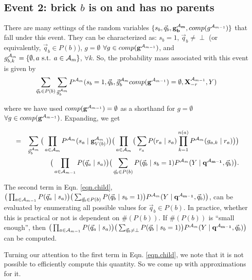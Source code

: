 \documentclass[11pt]{article}
\newcommand{\A}{{\cal A}}
\newcommand{\X}{\mathbf{X}}
\newcommand{\XrmPrev}{\X^{\A_{m-1}}_{-r}}
\newcommand{\Am}{\A_{m}}
\newcommand{\gcompPrev}{comp(\mathbf{g}^{\A_{m-1}})}
\newcommand{\qb}{\vec{q}_b}
\newcommand{\qa}{\vec{q}_a}
\begin{document}
\subsection*{Event 2: brick $b$ is on and has no parents}

There are many settings of the random variables $\{s_b, \qb, \mathbf{g^{\Am}_b}, comp(g^{\A_{m-1}})\}$ that fall under this event. They can be characterized as: $s_b=1$, $\qb \neq \perp$ (or equivalently, $\qb \in P(b)$), $g = \emptyset$ $\forall g \in \gcompPrev$, and $g^{\Am}_{b,k} = \{\emptyset, a \text{ s.t. } a \in {\Am}\}$, $\forall k$. So, the probability mass associated with this event is given by
\begin{eqnarray}
\sum_{\vec{q}_b \in P(b)} \sum_{\vec{g}^{\Am}_{b}} P^{\Am}(s_b=1, \vec{q}_b, \vec{g}^{\Am}_{b} \gcompPrev = \emptyset, \XrmPrev, Y)
\end{eqnarray}

where we have used $\gcompPrev = \emptyset$ as a shorthand for $g = \emptyset$ $\forall g \in \gcompPrev$. Expanding, we get

\begin{eqnarray}
&=& \sum_{\vec{g}^{\Am}_{b}} \big( \prod_{a \in {\Am}} P^{\Am}(s_a \mid \mathbf{g}^{\Am}_{V({b})}) \big ) \big( \prod_{a \in {\A_{m}}} \big( \sum_{r_a} P(r_a \mid s_a) \prod_{k=1}^{n(a)} P^{\Am}(g_{a,k} \mid r_a) \big) \big) \label{eqn.child} \\
%
& & \big( \prod_{a \in {\A_{m-1}}} P(\qa \mid s_a)\big) \big( \sum_{\vec{q}_b \in P(b)} P(\qb \mid s_b = 1) P^{\Am}(Y \mid \mathbf{q^{\A_{m-1}}}, \vec{q}_b) \big). \nonumber
\end{eqnarray}

The second term in Eqn. \ref{eqn.child}, $\big( \prod_{a \in {\A_{m-1}}} P(\qa \mid s_a)\big) \big( \sum_{\vec{q}_b \in P(b)} P(\qb \mid s_b = 1)\big) P^{\Am}(Y \mid \mathbf{q^{\A_{m-1}}}, \vec{q}_b) \big)$, can be evaluated by enumerating all possible values for $\vec{q}_b \in P(b)$. In practice, whether this is practical or not is dependent on $\#(P(b))$. If $\#(P(b))$ is ``small enough'', then $\big( \prod_{a \in {\A_{m-1}}} P(\qa \mid s_a)\big) \big( \sum_{\vec{q}_b \neq \perp} P(\qb \mid s_b = 1)\big) P^{\Am}(Y \mid \mathbf{q^{\A_{m-1}}}, \vec{q}_b) \big)$ can be computed. 

Turning our attention to the first term in Eqn. \ref{eqn.child}, we note that it is not possible to efficiently compute this quantity. So we come up with approximations for it.
\end{document}
